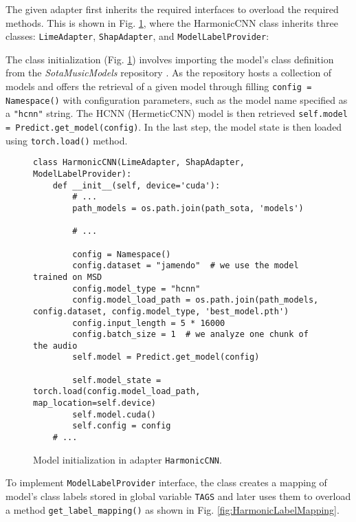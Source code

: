 \documentclass[
    bindingoffset=5mm,  %
    footnoteindent=3mm, %
    hyphenation=true    %
]{src/wut-thesis}
\begin{document}
The given adapter first inherits the required interfaces to overload the required methods.
This is shown in Fig. \ref{fig:HarmonicCNNInit}, where the HarmonicCNN class inherits three classes:
\texttt{LimeAdapter}, \texttt{ShapAdapter}, and \texttt{ModelLabelProvider}:

The class initialization (Fig. \ref{fig:HarmonicCNNInit}) involves importing the model’s class definition
from the \textit{SotaMusicModels} repository \cite{Won2020-ej}. As the repository hosts a collection
of models and offers the retrieval of a given model through filling \texttt{config = Namespace()} with
configuration parameters, such as the model name specified as a \texttt{"hcnn"} string.
The HCNN (HermeticCNN) model is then retrieved \texttt{self.model = Predict.get_model(config)}.
In the last step, the model state is then loaded using \texttt{torch.load()} method.

\begin{figure}%
\begin{verbatim}
class HarmonicCNN(LimeAdapter, ShapAdapter, ModelLabelProvider):
    def __init__(self, device='cuda'):
        # ...
        path_models = os.path.join(path_sota, 'models')

        # ...

        config = Namespace()
        config.dataset = "jamendo"  # we use the model trained on MSD
        config.model_type = "hcnn"
        config.model_load_path = os.path.join(path_models, config.dataset, config.model_type, 'best_model.pth')
        config.input_length = 5 * 16000
        config.batch_size = 1  # we analyze one chunk of the audio
        self.model = Predict.get_model(config)
        
        self.model_state = torch.load(config.model_load_path, map_location=self.device)
        self.model.cuda()
        self.config = config
    # ...
\end{verbatim}
\caption{Model initialization in adapter \texttt{HarmonicCNN}.}
\label{fig:HarmonicCNNInit}
\end{figure}

To implement \texttt{ModelLabelProvider} interface, the class creates a mapping of model's class
labels stored in global variable \texttt{TAGS} and later uses them to overload
a method \texttt{get_label_mapping()} as shown in Fig. \ref{fig:HarmonicLabelMapping}.
\end{document}
